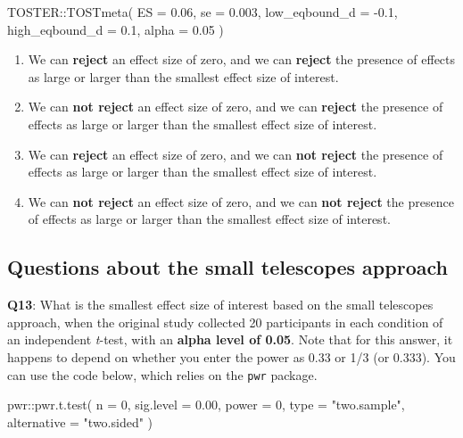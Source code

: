 \documentclass[
  oneside]{book}
\newenvironment{Shaded}{\begin{snugshade}}{\end{snugshade}}
\newcommand{\AttributeTok}[1]{\textcolor[rgb]{0.77,0.63,0.00}{#1}}
\newcommand{\DecValTok}[1]{\textcolor[rgb]{0.00,0.00,0.81}{#1}}
\newcommand{\FloatTok}[1]{\textcolor[rgb]{0.00,0.00,0.81}{#1}}
\newcommand{\FunctionTok}[1]{\textcolor[rgb]{0.00,0.00,0.00}{#1}}
\newcommand{\NormalTok}[1]{#1}
\newcommand{\SpecialCharTok}[1]{\textcolor[rgb]{0.00,0.00,0.00}{#1}}
\newcommand{\StringTok}[1]{\textcolor[rgb]{0.31,0.60,0.02}{#1}}
\providecommand{\tightlist}{%
  \setlength{\itemsep}{0pt}\setlength{\parskip}{0pt}}
\begin{document}
\begin{Shaded}
\begin{Highlighting}[]
\NormalTok{TOSTER}\SpecialCharTok{::}\FunctionTok{TOSTmeta}\NormalTok{(}
  \AttributeTok{ES =} \FloatTok{0.06}\NormalTok{,}
  \AttributeTok{se =} \FloatTok{0.003}\NormalTok{,}
  \AttributeTok{low\_eqbound\_d =} \SpecialCharTok{{-}}\FloatTok{0.1}\NormalTok{,}
  \AttributeTok{high\_eqbound\_d =} \FloatTok{0.1}\NormalTok{,}
  \AttributeTok{alpha =} \FloatTok{0.05}
\NormalTok{)}
\end{Highlighting}
\end{Shaded}

\begin{enumerate}
\def\labelenumi{\Alph{enumi})}
\tightlist
\item
  We can \textbf{reject} an effect size of zero, and we can \textbf{reject} the presence of effects as large or larger than the smallest effect size of interest.
\item
  We can \textbf{not reject} an effect size of zero, and we can \textbf{reject} the presence of effects as large or larger than the smallest effect size of interest.
\item
  We can \textbf{reject} an effect size of zero, and we can \textbf{not reject} the presence of effects as large or larger than the smallest effect size of interest.
\item
  We can \textbf{not reject} an effect size of zero, and we can \textbf{not reject} the presence of effects as large or larger than the smallest effect size of interest.
\end{enumerate}

\hypertarget{questions-about-the-small-telescopes-approach}{%
\subsection{Questions about the small telescopes approach}\label{questions-about-the-small-telescopes-approach}}

\textbf{Q13}: What is the smallest effect size of interest based on the small telescopes approach, when the original study collected 20 participants in each condition of an independent \emph{t}-test, with an \textbf{alpha level of 0.05}. Note that for this answer, it happens to depend on whether you enter the power as 0.33 or 1/3 (or 0.333). You can use the code below, which relies on the \texttt{pwr} package.

\begin{Shaded}
\begin{Highlighting}[]
\NormalTok{pwr}\SpecialCharTok{::}\FunctionTok{pwr.t.test}\NormalTok{(}
  \AttributeTok{n =} \DecValTok{0}\NormalTok{, }
  \AttributeTok{sig.level =} \FloatTok{0.00}\NormalTok{, }
  \AttributeTok{power =} \DecValTok{0}\NormalTok{, }
  \AttributeTok{type =} \StringTok{"two.sample"}\NormalTok{,}
  \AttributeTok{alternative =} \StringTok{"two.sided"}
\NormalTok{)}
\end{Highlighting}
\end{Shaded}
\end{document}
